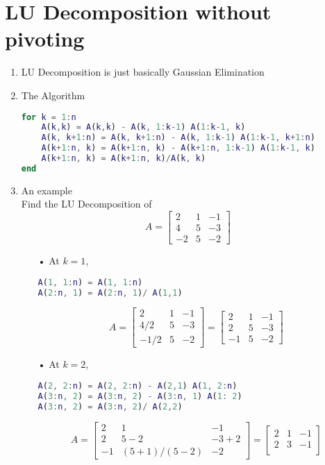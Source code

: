 \documentclass[11pt]{article}
\begin{document}
\section{LU Decomposition without pivoting}
\begin{enumerate}
\item{LU Decomposition is just basically Gaussian Elimination}
\item{The Algorithm}
\begin{lstlisting}[language=matlab]
for k = 1:n
	A(k,k) = A(k,k) - A(k, 1:k-1) A(1:k-1, k)
	A(k, k+1:n) = A(k, k+1:n) - A(k, 1:k-1) A(1:k-1, k+1:n)
	A(k+1:n, k) = A(k+1:n, k) - A(k+1:n, 1:k-1) A(1:k-1, k)
	A(k+1:n, k) = A(k+1:n, k)/A(k, k)
end
\end{lstlisting}
\item{An example}\\
Find the LU Decomposition of $$A = 
\begin{bmatrix}
	2& 1& -1\\
	4& 5& -3\\
	-2& 5& -2	
\end{bmatrix}$$
\begin{itemize}
\item[•]At $k =1$,
\begin{lstlisting}[language=matlab]
A(1, 1:n) = A(1, 1:n)
A(2:n, 1) = A(2:n, 1)/ A(1,1)
\end{lstlisting}
$$A = 
\begin{bmatrix}
	2& 1& -1\\
	4/2& 5& -3\\
	-1/2& 5& -2	
\end{bmatrix}
= \begin{bmatrix}
	2& 1& -1\\
	2& 5& -3\\
	-1& 5& -2	
\end{bmatrix}$$
\item[•]At $k=2$,
\begin{lstlisting}[language=matlab]
A(2, 2:n) = A(2, 2:n) - A(2,1) A(1, 2:n)
A(3:n, 2) = A(3:n, 2) - A(3:n, 1) A(1: 2)
A(3:n, 2) = A(3:n, 2)/ A(2,2)
\end{lstlisting}
$$A=
\begin{bmatrix}
	2& 1& -1\\
	2& 5-2& -3+2\\
	-1& (5+1)/(5-2)& -2	
\end{bmatrix} =
\begin{bmatrix}
	2& 1& -1\\
	2& 3& -1\\

\end{bmatrix}$$
\end{itemize}
\end{enumerate}
\end{document}
